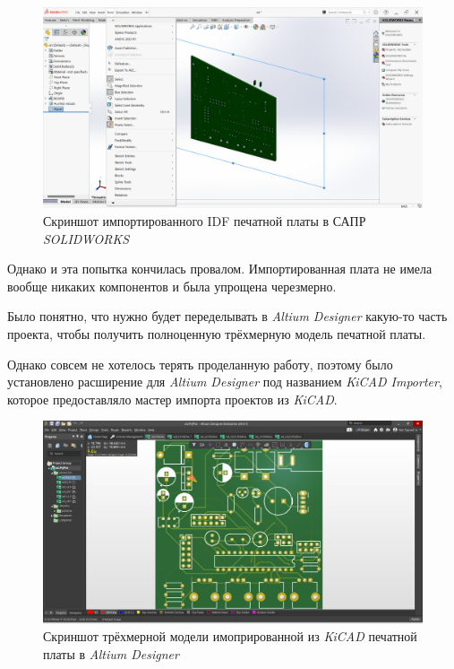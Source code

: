 \begin{figure}[H]
  \centering
  \includegraphics[scale=0.2]{../img/scrot/Screenshot-2024-05-06-175849.png}
  \caption{Скриншот импортированного IDF печатной платы в САПР \textit{SOLIDWORKS}}
\end{figure}

Однако и эта попытка кончилась провалом. Импортированная плата не имела вообще никаких компонентов и была упрощена черезмерно.

Было понятно, что нужно будет переделывать в \textit{Altium Designer} какую-то часть проекта, чтобы получить полноценную трёхмерную модель печатной платы.

Однако совсем не хотелось терять проделанную работу, поэтому было установлено расширение для \textit{Altium Designer} под названием \textit{KiCAD Importer}, которое предоставляло мастер импорта проектов из \textit{KiCAD}.

\begin{figure}[H]
  \centering
  \includegraphics[scale=0.2]{../img/scrot/Screenshot-2024-05-08-110214.png}
  \caption{Скриншот трёхмерной модели имопрированной из \textit{KiCAD} печатной платы в \textit{Altium Designer}}

\end{figure}

